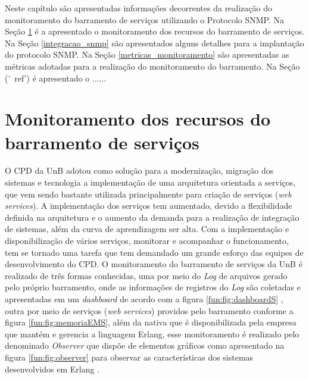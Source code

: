 \label{monitoramento_servicos}

Neste capítulo são apresentadas informações decorrentes da realização do monitoramento do barramento de serviços utilizando o Protocolo \acrshort{SNMP}. Na Seção \ref{recursos_monitoramento} é a apresentado o monitoramento dos recursos do barramento de serviços. Na Seção \ref{integracao_snmp} são apresentados alguns detalhes para a implantação do protocolo \acrshort{SNMP}. Na Seção \ref{metricas_monitoramento} são apresentadas as métricas adotadas para a realização do monitoramento do barramento. Na Seção ('\ ref') é apresentado o ......

\section{Monitoramento dos recursos do barramento de serviços}%
\label{recursos_monitoramento}

O \acrshort{CPD} da \acrshort{UnB} adotou como solução para a modernização, migração dos sistemas e tecnologia a implementação de uma arquitetura orientada a serviços, que vem sendo bastante utilizada principalmente para criação de serviços (\textit{web services}). A implementação dos serviços tem aumentado, devido a flexibilidade definida na arquitetura e o aumento da demanda para a realização de integração de sistemas, além da curva de aprendizagem ser alta. Com a implementação e disponibilização de  vários serviços, monitorar e acompanhar o funcionamento, tem se tornado uma tarefa que tem demandado um grande esforço das equipes de 
desenvolvimento do \acrshort{CPD}. O monitoramento do barramento de serviços da \acrshort{UnB} é realizado de três formas conhecidas, uma por meio do \textit{Log} de arquivos gerado pelo próprio barramento, onde as informações de registros do \textit{Log} são coletadas e apresentadas em um \textit{dashboard} de acordo com a figura \ref{fun:fig:dashboardS} \cite{filgueirasmonitoramento}, outra por meio de serviços (\textit{web services}) providos pelo barramento conforme a figura \ref{fun:fig:memoriaEMS}, além da nativa que é disponibilizada pela empresa que mantém e gerencia a linguagem Erlang, esse monitoramento é realizado pelo denominado \textit{Observer} que dispõe de elementos gráficos como apresentado na figura \ref{fun:fig:observer} para observar as características dos sistemas desenvolvidos em Erlang \cite{ericssonAB2002-2019}. 

